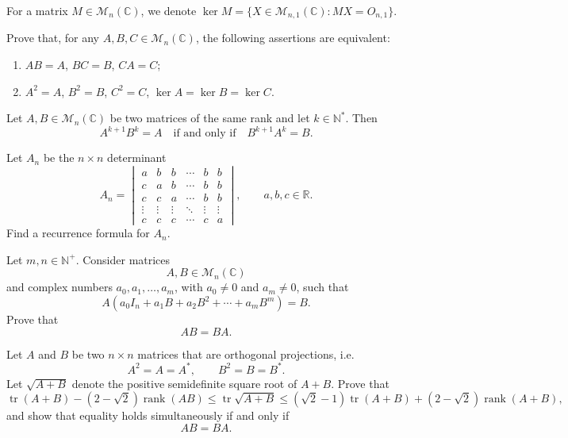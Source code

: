 \documentclass[12pt]{article}
\DeclareMathOperator{\tr}{tr}
\DeclareMathOperator{\rank}{rank}
\begin{document}
\begin{problem}
For a matrix $M \in \mathcal{M}_n(\mathbb{C})$, we denote $\ker M = \{X \in \mathcal{M}_{n,1}(\mathbb{C}) : MX = O_{n,1}\}$.

Prove that, for any $A, B, C \in \mathcal{M}_n(\mathbb{C})$, the following assertions are equivalent:
\begin{enumerate}[label=(\roman*)]
\item $AB = A$, $BC = B$, $CA = C$;
\item $A^2 = A$, $B^2 = B$, $C^2 = C$, $\ker A = \ker B = \ker C$.
\end{enumerate}
\end{problem}

\begin{problem}
Let $A, B \in \mathcal{M}_n(\mathbb{C})$ be two matrices of the same rank and let $k \in \mathbb{N}^*$. Then
\[
A^{k+1}B^k = A \quad \text{if and only if} \quad B^{k+1}A^k = B.
\]
\end{problem}

\begin{problem}
Let \(A_n\) be the \(n\times n\) determinant
\[
A_n=
\begin{vmatrix}
a&b&b&\cdots&b&b\\
c&a&b&\cdots&b&b\\
c&c&a&\cdots&b&b\\
\vdots&\vdots&\vdots&\ddots&\vdots&\vdots\\
c&c&c&\cdots&c&a
\end{vmatrix},
\qquad a,b,c\in\mathbb R.
\]
Find a recurrence formula for \(A_n\).
\end{problem}

\begin{problem}
Let \(m,n\in\mathbb N^+\). Consider matrices
\[
A,B\in\mathcal M_n(\mathbb C)
\]
and complex numbers \(a_0,a_1,\ldots,a_m\), with \(a_0\ne0\) and \(a_m\ne0\), such that
\[
A\left(a_0I_n+a_1B+a_2B^2+\cdots+a_mB^m\right)=B.
\]
Prove that
\[
AB=BA.
\]
\end{problem}

\begin{problem}
Let \(A\) and \(B\) be two \(n\times n\) matrices that are orthogonal projections, i.e.
\[
A^2=A=A^*,\qquad B^2=B=B^*.
\]
Let \(\sqrt{A+B}\) denote the positive semidefinite square root of \(A+B\).
Prove that
\[
\tr(A+B)-(2-\sqrt2)\rank(AB)
\le \tr\sqrt{A+B}
\le
(\sqrt2-1)\tr(A+B)+(2-\sqrt2)\rank(A+B),
\]
and show that equality holds simultaneously if and only if
\[
AB=BA.
\]
\end{problem}
\end{document}
